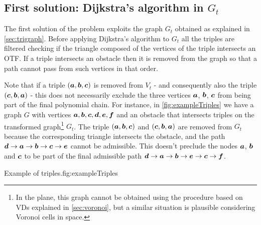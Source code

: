 \documentclass[dissertation.tex]{subfiles}
\begin{document}
\subsection{First solution: Dijkstra's algorithm in $G_t$}\label{sec:inter1}
The first solution of the problem exploits the graph $G_t$ obtained as
explained in \cref{sec:trigraph}. Before applying Dijkstra's algorithm
to $G_t$ all the triples are filtered checking if the
triangle composed of the vertices of the triple intersects an
\ac{OTF}. If a triple intersects an obstacle then it is removed from the
graph
so that a path cannot pass from such vertices in that order.

Note that if a triple $(\boldsymbol{a},\boldsymbol{b},\boldsymbol{c})$ is removed from $V_t$ - and
consequently also the triple $(\boldsymbol{c},\boldsymbol{b},\boldsymbol{a})$ - this does not
necessarily exclude
the three vertices $\boldsymbol{a}$, $\boldsymbol{b}$, $\boldsymbol{c}$ from being part of the final
polynomial chain. For instance, in
\cref{fig:exampleTriples} we have a graph $G$ with vertices
$\boldsymbol{a},\boldsymbol{b},\boldsymbol{c},\boldsymbol{d},\boldsymbol{e},\boldsymbol{f}$ and an obstacle that
intersects triples on the transformed graph\footnote{In the plane, this graph cannot be
  obtained using the procedure based on \acp{VD} explained in
  \cref{sec:voronoi}, but a similar situation is plausible
  considering Voronoi cells in space.} $G_t$. The triple
$(\boldsymbol{a},\boldsymbol{b},\boldsymbol{c})$ and $(\boldsymbol{c},\boldsymbol{b},\boldsymbol{a})$ are removed from $G_t$ because
the corresponding triangle intersects the obstacle, and the path
$\boldsymbol{d}\rightarrow \boldsymbol{a}\rightarrow \boldsymbol{b}\rightarrow \boldsymbol{c}\rightarrow \boldsymbol{e}$ cannot be
admissible. This doesn't preclude the nodes $\boldsymbol{a}$, $\boldsymbol{b}$ and $\boldsymbol{c}$ to be part
of the final admissible path $\boldsymbol{d}\rightarrow \boldsymbol{a}\rightarrow \boldsymbol{b}\rightarrow \boldsymbol{e}\rightarrow \boldsymbol{c}\rightarrow \boldsymbol{f}$.
\begin{myfig}{Example of triples.}{fig:exampleTriples}
\end{myfig}
\end{document}
